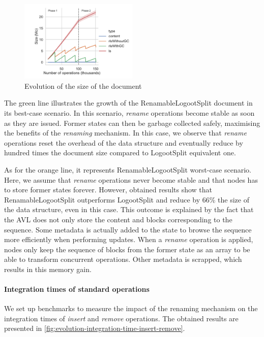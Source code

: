 \documentclass[sigplan,10pt]{acmart}
\begin{document}
\begin{figure}
    \centering
    \includegraphics[width=0.5\textwidth]{img/snapshots-sizes.pdf}
    \caption{Evolution of the size of the document}
    \label{fig:evolution-document-size}
\end{figure}

The green line illustrates the growth of the RenamableLogootSplit document in its best-case scenario.
In this scenario, \emph{rename} operations become stable as soon as they are issued.
Former states can then be garbage collected safely, maximising the benefits of the \emph{renaming} mechanism.
In this case, we observe that \emph{rename} operations reset the overhead of the data structure and eventually reduce by hundred times the document size compared to LogootSplit equivalent one.

As for the orange line, it represents RenamableLogootSplit worst-case scenario.
Here, we assume that \emph{rename} operations never become stable and that nodes has to store former states forever.
However, obtained results show that RenamableLogootSplit outperforms LogootSplit and reduce by 66\% the size of the data structure, even in this case.
This outcome is explained by the fact that the AVL does not only store the content and blocks corresponding to the sequence.
Some metadata is actually added to the state to browse the sequence more efficiently when performing updates.
When a \emph{rename} operation is applied, nodes only keep the sequence of blocks from the former state as an array to be able to transform concurrent operations.
Other metadata is scrapped, which results in this memory gain.

\paragraph{Integration times of standard operations}

We set up benchmarks to measure the impact of the renaming mechanism on the integration times of \emph{insert} and \emph{remove} operations.
The obtained results are presented in \autoref{fig:evolution-integration-time-insert-remove}.
\end{document}
